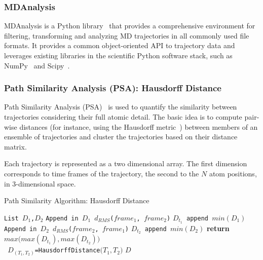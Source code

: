 \subsubsection{MDAnalysis}
\label{sec:mda}
MDAnalysis is a Python library~\cite{michaud2011mdanalysis,gowers2016mdanalysis} that provides a comprehensive environment for filtering, transforming and analyzing MD trajectories in all commonly used file formats.
It provides a common object-oriented API to trajectory data and leverages existing libraries in the scientific Python software stack, such as NumPy~\cite{numpy} and Scipy~\cite{scipy}.

\subsubsection*{Path Similarity Analysis (PSA): Hausdorff Distance}Path Similarity Analysis (PSA)~\cite{seyler2015path} is used to quantify the similarity between trajectories considering their full atomic detail.
The basic idea is to compute pair-wise distances (for instance, using the Hausdorff metric~\cite{huttenlocher1993comparing}) between members of an ensemble of trajectories and cluster the trajectories based on their distance matrix.

Each trajectory is represented as a two dimensional array.
The first dimension corresponds to time frames of the trajectory, the second to the $N$ atom positions, in 3-dimensional space.

\begin{algorithm}[ht]
    \scriptsize
    \caption{Path Similarity Algorithm: Hausdorff Distance}
    \label{alg:hausdorff}
    \begin{algorithmic}[1]
        \State \texttt{List $D_1$,$D_2$}
        \State \texttt{Append in $D_1$ $d_{RMS}$($frame_1$, $frame_2$)}
        \EndFor
        \State \texttt{$D_{t_1}$ append $min(D_1)$}
        \EndFor
        \State \texttt{Append in $D_2$ $d_{RMS}$($frame_2$, $frame_1$)}
        \EndFor
        \State\texttt{$D_{t_2}$ append $min(D_2)$}
        \EndFor
        \State \textbf{return} $max\Big(max(D_{t_1}),max(D_{t_2})\Big)$
        \EndProcedure
        \\        
        \State \texttt{ $D_{( T_1,T_2 )}$=HausdorffDistance$\Big( T_1,T_2 \Big)$} 
        \EndFor
        \EndFor
        \State \Return $D$
        \EndProcedure
    \end{algorithmic}
\end{algorithm}


